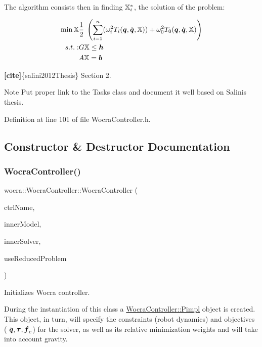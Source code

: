 The algorithm consists then in finding $\mathbb{X}_i^*$, the solution of the problem\+:

\begin{align*} \min{\mathbb{X}} & \frac{1}{2} \; \left( \sum_{i=1}^{n} (\omega_i^2 T_i (\mbox{\boldmath${q}$}, \dot{\mbox{\boldmath${q}$}}, \mathbb{X})) + \omega_0^2 T_0(\mbox{\boldmath${q}$}, \dot{\mbox{\boldmath${q}$}}, \mathbb{X}) \right) \\ s.t.: & G \mathbb{X} \leq \mbox{\boldmath${h}$} \\ & A \mathbb{X} = \mbox{\boldmath${b}$} \end{align*}

{\bfseries [cite]}\{salini2012\+Thesis\} Section 2.

\begin{DoxyNote}{Note}
Put proper link to the Tasks class and document it well based on Salini\textquotesingle{}s thesis. 
\end{DoxyNote}


Definition at line 101 of file Wocra\+Controller.\+h.



\subsection{Constructor \& Destructor Documentation}
\hypertarget{classwocra_1_1WocraController_ae14fda387f6d308aead6ab7a59e82e74}{}\label{classwocra_1_1WocraController_ae14fda387f6d308aead6ab7a59e82e74} 
\subsubsection{\texorpdfstring{Wocra\+Controller()}{WocraController()}}
{\footnotesize\ttfamily wocra\+::\+Wocra\+Controller\+::\+Wocra\+Controller (\begin{DoxyParamCaption}\item[{const std\+::string \&}]{ctrl\+Name,  }\item[{std\+::shared\+\_\+ptr$<$ Model $>$}]{inner\+Model,  }\item[{std\+::shared\+\_\+ptr$<$ \hyperlink{classocra_1_1OneLevelSolver}{One\+Level\+Solver} $>$}]{inner\+Solver,  }\item[{bool}]{use\+Reduced\+Problem }\end{DoxyParamCaption})}

Initializes Wocra controller.

During the instantiation of this class a \hyperlink{structwocra_1_1WocraController_1_1Pimpl}{Wocra\+Controller\+::\+Pimpl} object is created. This object, in turn, will specify the constraints (robot dynamics) and objectives ( $ \ddot{\mbox{\boldmath${q}$}}, \mbox{\boldmath${\tau}$}, \mbox{\boldmath${f}$}_c $) for the solver, as well as its relative minimization weights and will take into account gravity.



